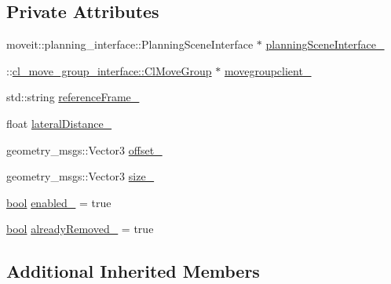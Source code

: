 \subsection*{Private Attributes}
\begin{DoxyCompactItemize}
\item 
moveit\+::planning\+\_\+interface\+::\+Planning\+Scene\+Interface $\ast$ \hyperlink{classsm__fetch__six__table__pick__n__sort__1_1_1cl__move__group__interface_1_1CpConstraintLateralWorkspace_aa35cde8d74f5d015e7a6384c2bbd1a16}{planning\+Scene\+Interface\+\_\+}
\item 
\+::\hyperlink{classcl__move__group__interface_1_1ClMoveGroup}{cl\+\_\+move\+\_\+group\+\_\+interface\+::\+Cl\+Move\+Group} $\ast$ \hyperlink{classsm__fetch__six__table__pick__n__sort__1_1_1cl__move__group__interface_1_1CpConstraintLateralWorkspace_a03b069a8b7cbf372cbe63a36f8ae3b4f}{movegroupclient\+\_\+}
\item 
std\+::string \hyperlink{classsm__fetch__six__table__pick__n__sort__1_1_1cl__move__group__interface_1_1CpConstraintLateralWorkspace_aa736818af32861dede32b3d3165bb72c}{reference\+Frame\+\_\+}
\item 
float \hyperlink{classsm__fetch__six__table__pick__n__sort__1_1_1cl__move__group__interface_1_1CpConstraintLateralWorkspace_a368d7033825c5a8d678d98fb412d5c0a}{lateral\+Distance\+\_\+}
\item 
geometry\+\_\+msgs\+::\+Vector3 \hyperlink{classsm__fetch__six__table__pick__n__sort__1_1_1cl__move__group__interface_1_1CpConstraintLateralWorkspace_aadcbc7ce532648f746b44140af17d36a}{offset\+\_\+}
\item 
geometry\+\_\+msgs\+::\+Vector3 \hyperlink{classsm__fetch__six__table__pick__n__sort__1_1_1cl__move__group__interface_1_1CpConstraintLateralWorkspace_a31750f9209a83e0abab106676f13b577}{size\+\_\+}
\item 
\hyperlink{classbool}{bool} \hyperlink{classsm__fetch__six__table__pick__n__sort__1_1_1cl__move__group__interface_1_1CpConstraintLateralWorkspace_ab8da476ed73090751dc61b38cb9426a3}{enabled\+\_\+} = true
\item 
\hyperlink{classbool}{bool} \hyperlink{classsm__fetch__six__table__pick__n__sort__1_1_1cl__move__group__interface_1_1CpConstraintLateralWorkspace_a303f8baa5e4a7ab06033b1885d604fb4}{already\+Removed\+\_\+} = true
\end{DoxyCompactItemize}
\subsection*{Additional Inherited Members}


